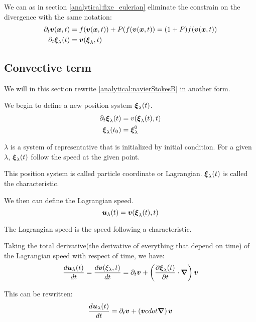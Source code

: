 We can as in section \ref{analytical:fixe_eulerian} eliminate the constrain on the divergence with the same notation:
\begin{align}
\partial_t {\boldsymbol {v}}({\boldsymbol {x}} ,t)&=f({\boldsymbol {v}}({\boldsymbol {x}},t))+P(f({\boldsymbol {v}}({\boldsymbol {x}},t))=(1+P)f({\boldsymbol {v}}({\boldsymbol {x}},t))\\
\partial_t {\boldsymbol {\xi}}_{\lambda}(t)&={\boldsymbol {v}}({\boldsymbol {\xi}}_{\lambda},t)
\end{align}

\subsection{Convective term}
\label{analytical:convectif}
We will in this section rewrite \ref{analytical:navierStokesB} in another form.

We begin to define a new position system ${\boldsymbol {\xi}}_{\lambda}(t)$.
\begin{align}
 \partial_t {\boldsymbol {\xi}}_{\lambda}(t)&=v({\boldsymbol {\xi}}_{\lambda}(t),t)\\
 {\boldsymbol {\xi}}_{\lambda}(t_0)&={\boldsymbol {\xi}}^{0}_{\lambda}
\end{align}

$\lambda$ is a system of representative that is initialized by initial condition.
For a given $\lambda$, ${\boldsymbol {\xi}}_{\lambda}(t)$ follow the speed at the given point.

This position system is called particle coordinate or Lagrangian.
${\boldsymbol {\xi}}_\lambda(t)$ is called the characteristic.

We then can define the Lagrangian speed.
\begin{equation}
 {\boldsymbol {u}}_{\lambda}(t)={\boldsymbol {v}}({\boldsymbol {\xi}}_{\lambda}(t),t)
\end{equation}

The Lagrangian speed is the speed following a characteristic.

Taking the total derivative(the derivative of everything that depend on time) of the Lagrangian speed with respect of time, we have:
\begin{equation}
\frac{d {\boldsymbol {u}}_{\lambda}(t)}{d t}=\frac{d {\boldsymbol {v}}(\xi_{\lambda},t)}{d t}=\partial_t {\boldsymbol {v}}+\left(\frac{\partial {\boldsymbol {\xi}}_{\lambda}(t)}{\partial t}\cdot{\boldsymbol {\nabla}}\right){\boldsymbol {v}}
\end{equation}

This can be rewritten:
\begin{equation}
\frac{d {\boldsymbol {u}}_{\lambda}(t)}{d t}=\partial_t {\boldsymbol {v}}+\left({\boldsymbol {v}} cdot{\boldsymbol {\nabla}}\right){\boldsymbol {v}}
\end{equation}

